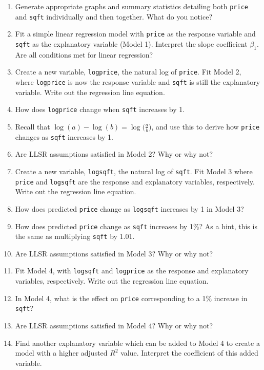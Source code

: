 \documentclass[
]{krantz}
\providecommand{\tightlist}{%
  \setlength{\itemsep}{0pt}\setlength{\parskip}{0pt}}
\begin{document}
\begin{enumerate}
  \begin{enumerate}
  \def\labelenumii{\alph{enumii}.}
  \tightlist
  \item
    Generate appropriate graphs and summary statistics detailing both \texttt{price} and \texttt{sqft} individually and then together. What do you notice?
  \item
    Fit a simple linear regression model with \texttt{price} as the response variable and \texttt{sqft} as the explanatory variable (Model 1). Interpret the slope coefficient \(\beta_1\). Are all conditions met for linear regression?
  \item
    Create a new variable, \texttt{logprice}, the natural log of \texttt{price}. Fit Model 2, where \texttt{logprice} is now the response variable and \texttt{sqft} is still the explanatory variable. Write out the regression line equation.
  \item
    How does \texttt{logprice} change when \texttt{sqft} increases by 1.
  \item
    Recall that \(\log(a) - \log(b) = \log\big(\frac{a}{b}\big)\), and use this to derive how \texttt{price} changes as \texttt{sqft} increases by 1.
  \item
    Are LLSR assumptions satisfied in Model 2? Why or why not?
  \item
    Create a new variable, \texttt{logsqft}, the natural log of \texttt{sqft}. Fit Model 3 where \texttt{price} and \texttt{logsqft} are the response and explanatory variables, respectively. Write out the regression line equation.
  \item
    How does predicted \texttt{price} change as \texttt{logsqft} increases by 1 in Model 3?
  \item
    How does predicted \texttt{price} change as \texttt{sqft} increases by 1\%? As a hint, this is the same as multiplying \texttt{sqft} by 1.01.
  \item
    Are LLSR assumptions satisfied in Model 3? Why or why not?
  \item
    Fit Model 4, with \texttt{logsqft} and \texttt{logprice} as the response and explanatory variables, respectively. Write out the regression line equation.
  \item
    In Model 4, what is the effect on \texttt{price} corresponding to a 1\% increase in \texttt{sqft}?
  \item
    Are LLSR assumptions satisfied in Model 4? Why or why not?
  \item
    Find another explanatory variable which can be added to Model 4 to create a model with a higher adjusted \(R^2\) value. Interpret the coefficient of this added variable.
  \end{enumerate}
\end{enumerate}
\end{document}
